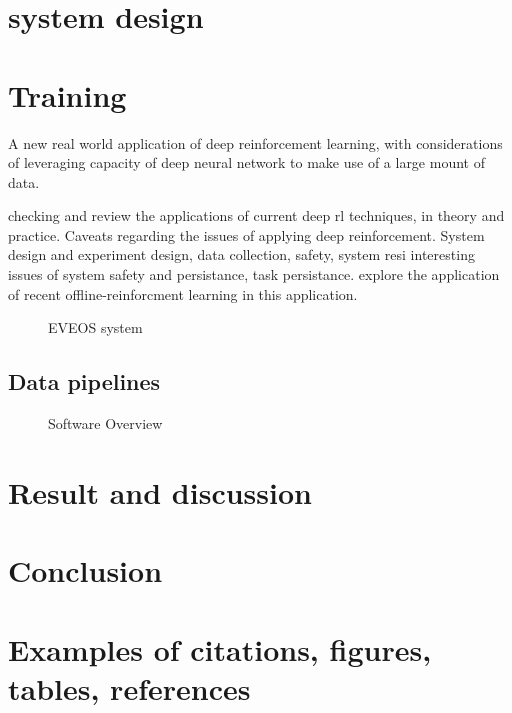 \documentclass{article}
\begin{document}
\section{system design}
\label{sec:design}

\section{Training}








A new real world application of deep reinforcement learning, with considerations of leveraging capacity of deep neural network to make use of a large mount of data.

checking and review the applications of current deep rl techniques, in theory and practice. Caveats regarding the issues of applying deep reinforcement. System design and experiment design, data collection, safety, system resi
interesting issues of system safety and persistance, task persistance.
explore the application of recent offline-reinforcment learning in this application.



\begin{figure}[ht]
	\centering
	\def\svgwidth{\columnwidth}
	
	\caption{\label{fig:veos} EVEOS system}
\end{figure}


\subsection{Data pipelines}

\begin{figure}[ht]
	\centering
	\def\svgwidth{\columnwidth}
	
	\caption{\label{fig:label} Software Overview}
\end{figure}


\section{Result and discussion}
\label{sec:result}


\section{Conclusion}
\label{sec:conclusion}




\section{Examples of citations, figures, tables, references}
\label{sec:others}
\end{document}
